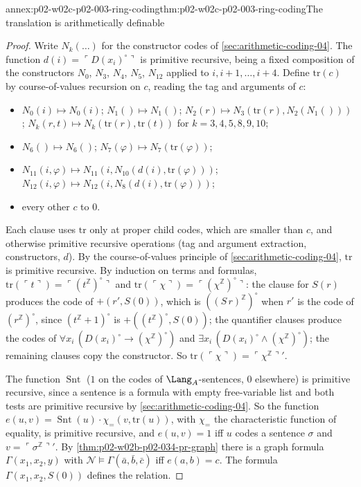 \begin{annexitem}{annex:p02-w02c-p02-003-ring-coding}{thm:p02-w02c-p02-003-ring-coding}{The translation is arithmetically definable}
\begin{proof}
Write \(N_k(\ldots)\) for the constructor codes of
\cref{sec:arithmetic-coding-04}.  The function \(d(i)=\ulcorner
D(x_i)^{\circ}\urcorner\) is primitive recursive, being a fixed
composition of the constructors \(N_0\), \(N_3\), \(N_4\), \(N_5\),
\(N_{12}\) applied to \(i,i+1,\ldots,i+4\).  Define \(\mathrm{tr}(c)\) by
course-of-values recursion on \(c\), reading the tag and arguments of
\(c\):
\begin{itemize}
\item \(N_0(i)\mapsto N_0(i)\); \(N_1()\mapsto N_1()\);
      \(N_2(r)\mapsto N_3(\mathrm{tr}(r),N_2(N_1()))\);
      \(N_k(r,t)\mapsto N_k(\mathrm{tr}(r),\mathrm{tr}(t))\) for
      \(k=3,4,5,8,9,10\);
\item \(N_6()\mapsto N_6()\); \(N_7(\varphi)\mapsto
      N_7(\mathrm{tr}(\varphi))\);
\item \(N_{11}(i,\varphi)\mapsto N_{11}(i,N_{10}(d(i),\mathrm{tr}(\varphi)))\);
      \(N_{12}(i,\varphi)\mapsto N_{12}(i,N_8(d(i),\mathrm{tr}(\varphi)))\);
\item every other \(c\) to \(0\).
\end{itemize}
Each clause uses \(\mathrm{tr}\) only at proper child codes, which are
smaller than \(c\), and otherwise primitive recursive operations (tag and
argument extraction, constructors, \(d\)).  By the course-of-values
principle of \cref{sec:arithmetic-coding-04}, \(\mathrm{tr}\) is
primitive recursive.  By induction on terms and formulas,
\(\mathrm{tr}(\ulcorner t\urcorner)=\ulcorner(t^{\mathbb Z})^{\circ}\urcorner\)
and \(\mathrm{tr}(\ulcorner\chi\urcorner)=\ulcorner(\chi^{\mathbb
Z})^{\circ}\urcorner\): the clause for \(S(r)\) produces the code of
\(+(r',S(0))\), which is \(((S\,r)^{\mathbb Z})^{\circ}\) when \(r'\) is
the code of \((r^{\mathbb Z})^{\circ}\), since \((t^{\mathbb
Z}+1)^{\circ}\) is \(+((t^{\mathbb Z})^{\circ},S(0))\); the quantifier
clauses produce the codes of \(\forall x_i\,(D(x_i)^{\circ}\to
(\chi^{\mathbb Z})^{\circ})\) and \(\exists x_i\,(D(x_i)^{\circ}\land
(\chi^{\mathbb Z})^{\circ})\); the remaining clauses copy the constructor.
So \(\mathrm{tr}(\ulcorner\chi\urcorner)=\ulcorner\chi^{\mathbb
Z}\urcorner'\).

The function \(\operatorname{Snt}\) (\(1\) on the codes of
\(\Lang_A\)-sentences, \(0\) elsewhere) is primitive recursive, since a
sentence is a formula with empty free-variable list and both tests are
primitive recursive by \cref{sec:arithmetic-coding-04}.  So the function
\(e(u,v)=\operatorname{Snt}(u)\cdot\chi_=(v,\mathrm{tr}(u))\), with
\(\chi_=\) the characteristic function of equality, is primitive
recursive, and \(e(u,v)=1\) iff \(u\) codes a sentence \(\sigma\) and
\(v=\ulcorner\sigma^{\mathbb Z}\urcorner'\).  By
\cref{thm:p02-w02b-p02-034-pr-graph} there is a graph formula
\(\Gamma(x_1,x_2,y)\) with \(\mathcal N\models\Gamma(\bar a,\bar b,\bar
c)\) iff \(e(a,b)=c\).  The formula \(\Gamma(x_1,x_2,S(0))\) defines the
relation.
\end{proof}
\end{annexitem}

